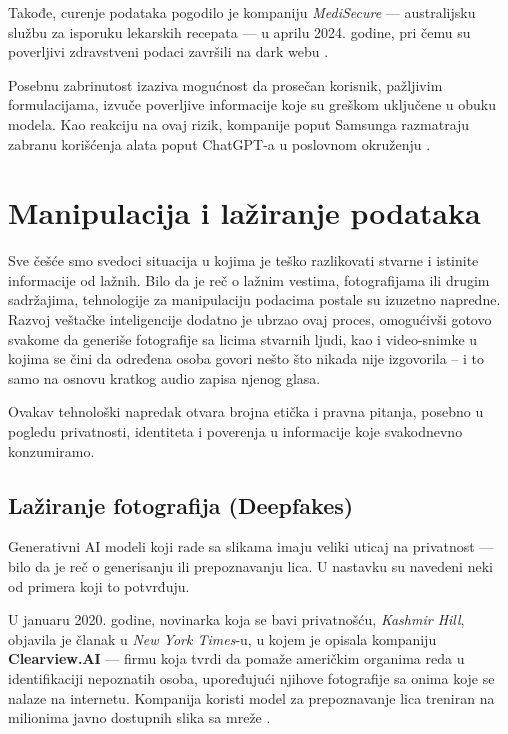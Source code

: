 \documentclass[a4paper,12pt]{article}
\begin{document}
Takođe, curenje podataka pogodilo je kompaniju \textit{MediSecure} — australijsku službu za isporuku lekarskih recepata — u aprilu 2024. godine, pri čemu su poverljivi zdravstveni podaci završili na dark webu \cite{nature_privacy_llm}. 

Posebnu zabrinutost izaziva mogućnost da prosečan korisnik, pažljivim formulacijama, izvuče poverljive informacije koje su greškom uključene u obuku modela. Kao reakciju na ovaj rizik, kompanije poput Samsunga razmatraju zabranu korišćenja alata poput ChatGPT-a u poslovnom okruženju \cite{10198233}. 


\section{Manipulacija i lažiranje podataka}
Sve češće smo svedoci situacija u kojima je teško razlikovati stvarne i istinite informacije od lažnih. Bilo da je reč o lažnim vestima, fotografijama ili drugim sadržajima, tehnologije za manipulaciju podacima postale su izuzetno napredne. Razvoj veštačke inteligencije dodatno je ubrzao ovaj proces, omogućivši gotovo svakome da generiše fotografije sa licima stvarnih ljudi, kao i video-snimke u kojima se čini da određena osoba govori nešto što nikada nije izgovorila – i to samo na osnovu kratkog audio zapisa njenog glasa.

Ovakav tehnološki napredak otvara brojna etička i pravna pitanja, posebno u pogledu privatnosti, identiteta i poverenja u informacije koje svakodnevno konzumiramo.


\subsection{Lažiranje fotografija (Deepfakes)}

Generativni AI modeli koji rade sa slikama imaju veliki uticaj na privatnost — bilo da je reč o generisanju ili prepoznavanju lica. U nastavku su navedeni neki od primera koji to potvrđuju.

U januaru 2020. godine, novinarka koja se bavi privatnošću, \textit{Kashmir Hill}, objavila je članak u \textit{New York Times}-u, u kojem je opisala kompaniju \textbf{Clearview.AI} — firmu koja tvrdi da pomaže američkim organima reda u identifikaciji nepoznatih osoba, upoređujući njihove fotografije sa onima koje se nalaze na internetu. Kompanija koristi model za prepoznavanje lica treniran na milionima javno dostupnih slika sa mreže \cite{lee2024deepfakesphrenologysurveillancemore}. 
\end{document}
